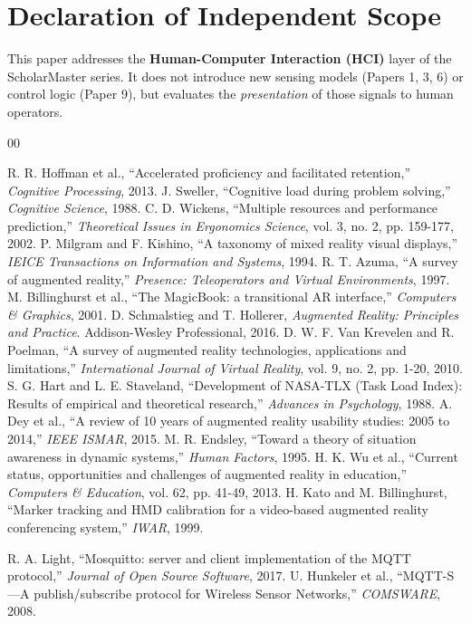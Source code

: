 \documentclass[conference]{IEEEtran}
\begin{document}
\section*{Declaration of Independent Scope}
This paper addresses the \textbf{Human-Computer Interaction (HCI)} layer of the ScholarMaster series. It does not introduce new sensing models (Papers 1, 3, 6) or control logic (Paper 9), but evaluates the \textit{presentation} of those signals to human operators.

\begin{thebibliography}{00}

 R. R. Hoffman et al., ``Accelerated proficiency and facilitated retention,'' \textit{Cognitive Processing}, 2013.
 J. Sweller, ``Cognitive load during problem solving,'' \textit{Cognitive Science}, 1988.
 C. D. Wickens, ``Multiple resources and performance prediction,'' \textit{Theoretical Issues in Ergonomics Science}, vol. 3, no. 2, pp. 159-177, 2002.
 P. Milgram and F. Kishino, ``A taxonomy of mixed reality visual displays,'' \textit{IEICE Transactions on Information and Systems}, 1994.
 R. T. Azuma, ``A survey of augmented reality,'' \textit{Presence: Teleoperators and Virtual Environments}, 1997.
 M. Billinghurst et al., ``The MagicBook: a transitional AR interface,'' \textit{Computers \& Graphics}, 2001.
 D. Schmalstieg and T. Hollerer, \textit{Augmented Reality: Principles and Practice}. Addison-Wesley Professional, 2016.
 D. W. F. Van Krevelen and R. Poelman, ``A survey of augmented reality technologies, applications and limitations,'' \textit{International Journal of Virtual Reality}, vol. 9, no. 2, pp. 1-20, 2010.
 S. G. Hart and L. E. Staveland, ``Development of NASA-TLX (Task Load Index): Results of empirical and theoretical research,'' \textit{Advances in Psychology}, 1988.
 A. Dey et al., ``A review of 10 years of augmented reality usability studies: 2005 to 2014,'' \textit{IEEE ISMAR}, 2015.
 M. R. Endsley, ``Toward a theory of situation awareness in dynamic systems,'' \textit{Human Factors}, 1995.
 H. K. Wu et al., ``Current status, opportunities and challenges of augmented reality in education,'' \textit{Computers \& Education}, vol. 62, pp. 41-49, 2013.
 H. Kato and M. Billinghurst, ``Marker tracking and HMD calibration for a video-based augmented reality conferencing system,'' \textit{IWAR}, 1999.

 R. A. Light, ``Mosquitto: server and client implementation of the MQTT protocol,'' \textit{Journal of Open Source Software}, 2017.
 U. Hunkeler et al., ``MQTT-S---A publish/subscribe protocol for Wireless Sensor Networks,'' \textit{COMSWARE}, 2008.


\end{thebibliography}
\end{document}
